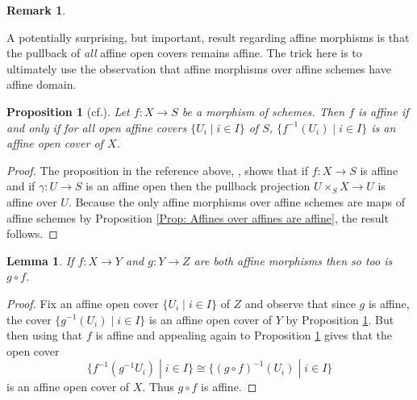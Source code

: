\documentclass{amsart}
\newtheorem{proposition}[equation]{Proposition}
\newtheorem{lemma}[equation]{Lemma}
\theoremstyle{definition}
\newtheorem{remark}[equation]{Remark}
\DeclareMathOperator{\Fbb}{\mathbb{F}}
\DeclareMathOperator{\red}{red}
\numberwithin{equation}{subsection}
\begin{document}
\begin{remark}
%
\end{remark}



A potentially surprising, but important, result regarding affine morphisms is that the pullback of \emph{all} affine open covers remains affine. The trick here is to ultimately use the observation that affine morphisms over affine schemes have affine domain.

\begin{proposition}[{cf.\@ \cite[Proposition 1.2.5]{EGA2}}]\label{Prop: Section Background Scheme: Affine iff affine for all covers}
	Let $f:X \to S$ be a morphism of schemes. Then $f$ is affine if and only if for all open affine covers $\lbrace U_i \; | \; i \in I \rbrace$ of $S$, $\lbrace f^{-1}(U_i) \; | \; i  \in I \rbrace$ is an affine open cover of $X$.
\end{proposition}
\begin{proof}
	The proposition in the reference above, \cite[Proposition 1.2.5]{EGA2}, shows that if $f:X \to S$ is affine and if $\gamma:U \to S$ is an affine open then the pullback projection $U \times_S X \to U$ is affine over $U$. Because the only affine morphisms over affine schemes are maps of affine schemes by Proposition \ref{Prop: Affines over affines are affine}, the result follows.
\end{proof}

\begin{lemma}\label{Lemma: Background Scheme: Affine morphisms stable under composition}
	If $f:X \to Y$ and $g:Y \to Z$ are both affine morphisms then so too is $g \circ f$.
\end{lemma}
\begin{proof}
Fix an affine open cover $\lbrace U_i \; | \; i \in I \rbrace$ of $Z$ and observe that since $g$ is affine, the cover $\lbrace g^{-1}(U_i) \; | \; i \in I\rbrace$ is an affine open cover of $Y$ by Proposition \ref{Prop: Section Background Scheme: Affine iff affine for all covers}. But then using that $f$ is affine and appealing again to Proposition \ref{Prop: Section Background Scheme: Affine iff affine for all covers} gives that the open cover
\[
\lbrace f^{-1}(g^{-1}U_i) \; | \; i \in I \rbrace \cong \lbrace (g \circ f)^{-1}(U_i) \; | \; i \in I \rbrace
\]
is an affine open cover of $X$. Thus $g \circ f$ is affine.
\end{proof}
\end{document}
